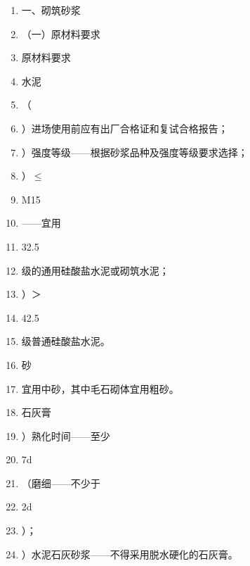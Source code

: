 \documentclass[UTF8,fontset=fandol,11pt]{ctexart}
\begin{document}
\begin{enumerate}[label=\arabic*.]

\item 一、砌筑砂浆

\item （一）原材料要求

\item 原材料要求

\item 水泥

\item （

\item ）进场使用前应有出厂合格证和复试合格报告；

\item ）强度等级——根据砂浆品种及强度等级要求选择；

\item ）$\leq$

\item M15

\item ——宜用

\item 32.5

\item 级的通用硅酸盐水泥或砌筑水泥；

\item ）＞

\item 42.5

\item 级普通硅酸盐水泥。

\item 砂

\item 宜用中砂，其中毛石砌体宜用粗砂。

\item 石灰膏

\item ）熟化时间——至少

\item 7d

\item （磨细——不少于

\item 2d

\item ）；

\item ）水泥石灰砂浆——不得采用脱水硬化的石灰膏。

\end{enumerate}
\end{document}
